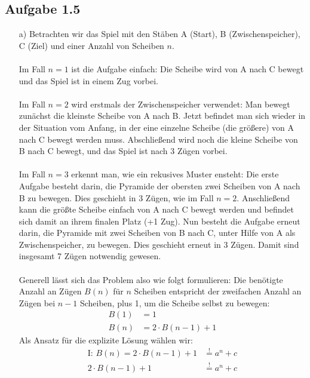 \documentclass{article}
\begin{document}
    \subsection*{Aufgabe 1.5}
    \begin{enumerate}
        \item[a)]
        Betrachten wir das Spiel mit den Stäben A (Start), B (Zwischenspeicher), C (Ziel) und einer Anzahl von Scheiben $n$. \\\\
        Im Fall $n=1$ ist die Aufgabe einfach: Die Scheibe wird von A nach C bewegt und das Spiel ist in einem Zug vorbei.\\\\
        Im Fall $n=2$ wird erstmals der Zwischenspeicher verwendet: Man bewegt zunächst die kleinste Scheibe von A nach B. Jetzt befindet
        man sich wieder in der Situation vom Anfang, in der eine einzelne Scheibe (die größere) von A nach C bewegt werden muss. Abschließend wird
        noch die kleine Scheibe von B nach C bewegt, und das Spiel ist nach 3 Zügen vorbei. \\\\
        Im Fall $n=3$ erkennt man, wie ein rekusives Muster ensteht: Die erste Aufgabe besteht darin, die Pyramide der obersten zwei Scheiben
        von A nach B zu bewegen. Dies geschieht in 3 Zügen, wie im Fall $n=2$. Anschließend kann die größte Scheibe einfach von A nach C bewegt werden und
        befindet sich damit an ihrem finalen Platz (+1 Zug). Nun besteht die Aufgabe erneut darin, die Pyramide mit zwei Scheiben von B nach C,
        unter Hilfe von A als Zwischenspeicher, zu bewegen. Dies geschieht erneut in 3 Zügen. Damit sind insgesamt 7 Zügen notwendig gewesen.\\\\
        Generell lässt sich das Problem also wie folgt formulieren: Die benötigte Anzahl an Zügen $B(n)$ für $n$ Scheiben entspricht der zweifachen Anzahl an
        Zügen bei $n-1$ Scheiben, plus 1, um die Scheibe selbst zu bewegen:
        \begin{align*}
            B(1) &= 1\\
            B(n) &= 2\cdot B(n-1) + 1
        \end{align*}
        Als Ansatz für die explizite Lösung wählen wir:
        \begin{align*}
            \textrm{I: } B(n)= 2\cdot B(n-1) + 1 &\stackrel{!}{=} a^n + c \\
            2\cdot B(n-1) + 1 &\stackrel{!}{=} a^n + c \\

\end{align*}
\end{enumerate}
\end{document}
